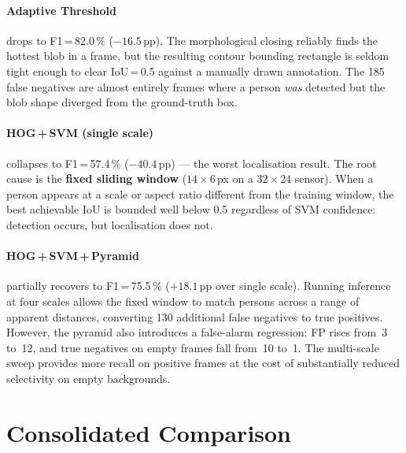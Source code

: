 \documentclass[11pt, a4paper]{article}
\begin{document}
\paragraph{Adaptive Threshold} drops to F1\,=\,82.0\,\% ($-16.5$\,pp).  The
morphological closing reliably finds the hottest blob in a frame, but the resulting
contour bounding rectangle is seldom tight enough to clear IoU\,=\,0.5 against a manually
drawn annotation.  The 185 false negatives are almost entirely frames where a person
\emph{was} detected but the blob shape diverged from the ground-truth box.

\paragraph{HOG\,+\,SVM (single scale)} collapses to F1\,=\,57.4\,\%
($-40.4$\,pp) — the worst localisation result.  The root cause is the \textbf{fixed
sliding window} ($14\!\times\!6$\,px on a $32\!\times\!24$ sensor).  When a person
appears at a scale or aspect ratio different from the training window, the best achievable
IoU is bounded well below 0.5 regardless of SVM confidence: detection occurs, but
localisation does not.

\paragraph{HOG\,+\,SVM\,+\,Pyramid} partially recovers to F1\,=\,75.5\,\%
($+18.1$\,pp over single scale).  Running inference at four scales allows the fixed window
to match persons across a range of apparent distances, converting 130 additional false
negatives to true positives.  However, the pyramid also introduces a false-alarm
regression: FP rises from~3 to~12, and true negatives on empty frames fall from~10 to~1.
The multi-scale sweep provides more recall on positive frames at the cost of substantially
reduced selectivity on empty backgrounds.

\section{Consolidated Comparison}
\end{document}
